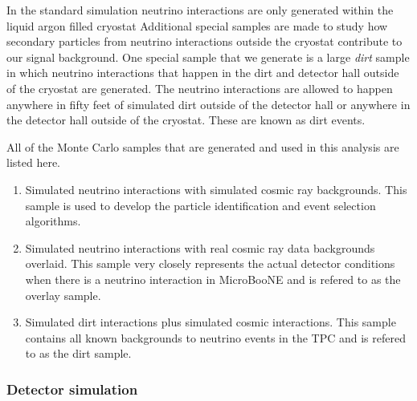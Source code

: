     In the standard simulation neutrino interactions are only generated within
    the liquid argon filled cryostat Additional special samples are made to
    study how secondary particles from neutrino interactions outside the
    cryostat contribute to our signal background. One special sample that we
    generate is a large \textit{dirt} sample in which neutrino interactions
    that happen in the dirt and detector hall outside of the cryostat are
    generated.  The neutrino interactions are allowed to happen anywhere in
    fifty feet of simulated dirt outside of the detector hall or anywhere in
    the detector hall outside of the cryostat. These are known as dirt events.

    All of the Monte Carlo samples that are generated and used in this analysis
    are listed here.
    \begin{enumerate}
      \item Simulated neutrino interactions with simulated cosmic ray
      backgrounds. This sample is used to develop the particle identification
      and event selection algorithms.
      \item Simulated neutrino interactions with real cosmic ray data backgrounds overlaid.
      This sample very closely represents the actual detector conditions when
      there is a neutrino interaction in MicroBooNE and is refered to as the
      overlay sample.
      \item Simulated dirt interactions plus simulated cosmic interactions.
      This sample contains all known backgrounds to neutrino events in the TPC
      and is refered to as the dirt sample.
    \end{enumerate}

  \subsubsection{Detector simulation}

